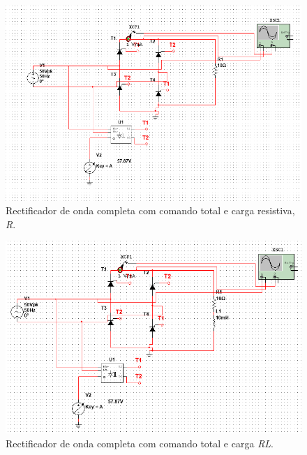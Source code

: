 \documentclass[a4paper,11pt]{article}
\numberwithin{equation}{section}
\begin{document}
\begin{figure}[h]
	\centering
	\includegraphics[keepaspectratio=true, scale=0.5]{img/circuito1}
	\caption{Rectificador de onda completa com comando total e carga resistiva, \textit{R}.}
	\label{fig:circuit_3}
	\vspace{-0.8em}
\end{figure}

\begin{figure}[h]
	\centering
	\includegraphics[keepaspectratio=true, scale=0.5]{img/circuito2}
	\caption{Rectificador de onda completa com comando total e carga \textit{RL}.}
	\label{fig:circuit_4}
	\vspace{-0.8em}
\end{figure}
\end{document}
